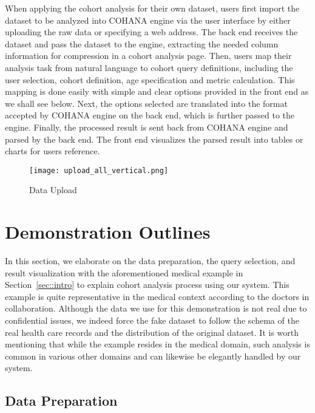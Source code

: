 When applying the cohort analysis for their own dataset, users first import the dataset to be analyzed into COHANA engine via the user interface by either uploading the raw data or specifying a web address.
The back end receives the dataset and pass the dataset to the engine, extracting the needed column information for compression in a cohort analysis page. 
Then, users map their analysis task from natural language to cohort query definitions, including the user selection, cohort definition, age specification and metric calculation.
This mapping is done easily with simple and clear options provided in the front end as we shall see below.
Next, the options selected are translated into the format accepted by COHANA engine on the back end, which is further passed to the engine. 
Finally, the processed result is sent back from COHANA engine and parsed by the back end. The front end visualizes the parsed result into tables or charts for users reference.
\begin{figure}
    \centering
    \texttt{[image: upload\_all\_vertical.png]}
    \vspace{-1em}
    \caption{Data Upload}
    \label{fig:upload}
    \vspace{-3em}
\end{figure}

\section{Demonstration Outlines}

In this section, we elaborate on the data preparation, the query selection, and result visualization with the aforementioned medical example in Section~\ref{sec::intro} to explain cohort analysis process using our system. This example is quite representative in the medical context according to the doctors in collaboration.
Although the data we use for this demonstration is not real due to confidential issues, we indeed force the fake dataset to follow the schema of the real health care records and the distribution of the original dataset.
It is worth mentioning that while the example resides in the medical domain, such analysis is common in various other domains and can likewise be elegantly handled by our system.

\subsection{Data Preparation}

